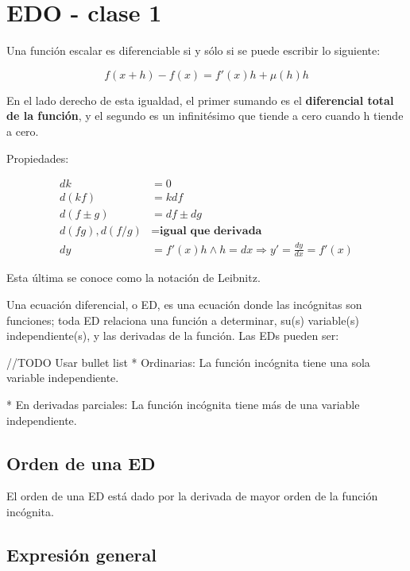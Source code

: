 \documentclass{article}
\begin{document}
 

\section{EDO - clase 1}

Una función escalar es diferenciable si y sólo si se puede escribir lo siguiente:

\begin{equation}
f(x+h) - f(x) = f'(x) h + \mu(h) h
\end{equation}

En el lado derecho de esta igualdad, el primer sumando es el \textbf{diferencial total de la función}, y el segundo es un infinitésimo que tiende a cero cuando h tiende a cero.

Propiedades:

\begin{subequations}
\begin{align}
d k & = 0 \\
d(k f) & = k df \\
d(f \pm g) & = df \pm dg \\
d(f g), d( f / g ) & = \textbf{igual que derivada} \\
dy & = f'(x) h \wedge h = dx \Longrightarrow y' = \frac{dy}{dx} = f'(x)
\end{align}
\end{subequations}

Esta última se conoce como la notación de Leibnitz.

Una ecuación diferencial, o ED, es una ecuación donde las incógnitas son funciones; toda ED relaciona una función a determinar, su(s) variable(s) independiente(s), y las derivadas de la función. Las EDs pueden ser:

//TODO Usar bullet list
* Ordinarias: La función incógnita tiene una sola variable independiente.

* En derivadas parciales: La función incógnita tiene más de una variable independiente.


\subsection{Orden de una ED}

El orden de una ED está dado por la derivada de mayor orden de la función incógnita.

\subsection{Expresión general}
\end{document}
